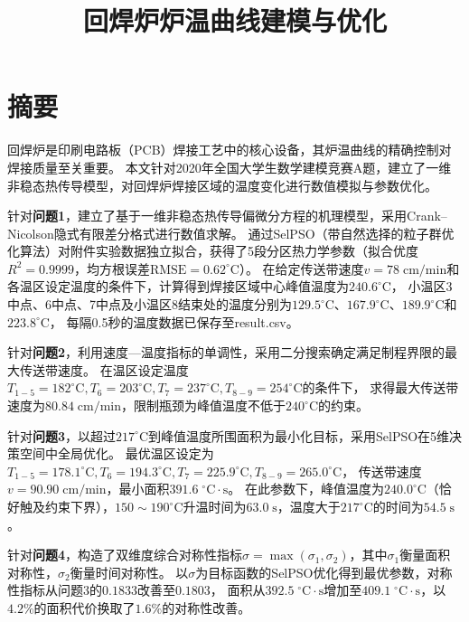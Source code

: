 \documentclass[12pt,a4paper]{ctexart}
\title{\vspace{-2cm}\textbf{回焊炉炉温曲线建模与优化}}
\author{}
\date{}
\begin{document}
\maketitle
\thispagestyle{empty}

\section*{摘\quad 要}
\thispagestyle{fancy}

回焊炉是印刷电路板（PCB）焊接工艺中的核心设备，其炉温曲线的精确控制对焊接质量至关重要。
本文针对2020年全国大学生数学建模竞赛A题，建立了一维非稳态热传导模型，对回焊炉焊接区域的温度变化进行数值模拟与参数优化。

针对\textbf{问题1}，建立了基于一维非稳态热传导偏微分方程的机理模型，采用Crank--Nicolson隐式有限差分格式进行数值求解。
通过SelPSO（带自然选择的粒子群优化算法）对附件实验数据独立拟合，获得了5段分区热力学参数（拟合优度$R^2=0.9999$，均方根误差$\mathrm{RMSE}=0.62^{\circ}\mathrm{C}$）。
在给定传送带速度$v=78\;\mathrm{cm/min}$和各温区设定温度的条件下，计算得到焊接区域中心峰值温度为$240.6^{\circ}\mathrm{C}$，
小温区3中点、6中点、7中点及小温区8结束处的温度分别为$129.5^{\circ}\mathrm{C}$、$167.9^{\circ}\mathrm{C}$、$189.9^{\circ}\mathrm{C}$和$223.8^{\circ}\mathrm{C}$，
每隔0.5秒的温度数据已保存至result.csv。

针对\textbf{问题2}，利用速度—温度指标的单调性，采用二分搜索确定满足制程界限的最大传送带速度。
在温区设定温度$T_{1-5}=182^{\circ}\mathrm{C},T_6=203^{\circ}\mathrm{C},T_7=237^{\circ}\mathrm{C},T_{8-9}=254^{\circ}\mathrm{C}$的条件下，
求得最大传送带速度为$\boldsymbol{80.84\;\mathrm{cm/min}}$，限制瓶颈为峰值温度不低于$240^{\circ}\mathrm{C}$的约束。

针对\textbf{问题3}，以超过$217^{\circ}\mathrm{C}$到峰值温度所围面积为最小化目标，采用SelPSO在5维决策空间中全局优化。
最优温区设定为$T_{1-5}=178.1^{\circ}\mathrm{C},T_6=194.3^{\circ}\mathrm{C},T_7=225.9^{\circ}\mathrm{C},T_{8-9}=265.0^{\circ}\mathrm{C}$，
传送带速度$v=90.90\;\mathrm{cm/min}$，最小面积$\boldsymbol{391.6\;^{\circ}\mathrm{C}\!\cdot\!\mathrm{s}}$。
在此参数下，峰值温度为$240.0^{\circ}\mathrm{C}$（恰好触及约束下界），$150\sim190^{\circ}\mathrm{C}$升温时间为$63.0\;\mathrm{s}$，温度大于$217^{\circ}\mathrm{C}$的时间为$54.5\;\mathrm{s}$。

针对\textbf{问题4}，构造了双维度综合对称性指标$\sigma=\max(\sigma_1,\sigma_2)$，其中$\sigma_1$衡量面积对称性，$\sigma_2$衡量时间对称性。
以$\sigma$为目标函数的SelPSO优化得到最优参数，对称性指标从问题3的$0.1833$改善至$\boldsymbol{0.1803}$，
面积从$392.5\;^{\circ}\mathrm{C}\!\cdot\!\mathrm{s}$增加至$409.1\;^{\circ}\mathrm{C}\!\cdot\!\mathrm{s}$，以$4.2\%$的面积代价换取了$1.6\%$的对称性改善。
\end{document}
